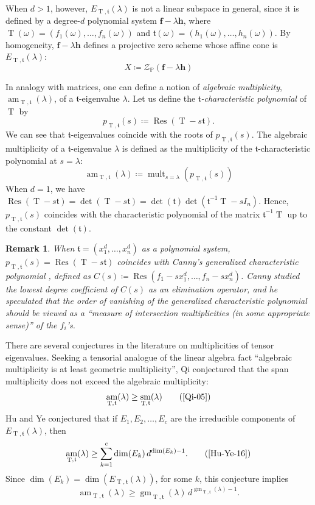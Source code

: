 \documentclass[11pt,letterpaper]{article}
\newtheorem{remark}[theorem]{Remark}\AddToHook{env/remark/begin}{\crefalias{theorem}{remark}}
\numberwithin{equation}{section}
\newcommand{\PP}{\mathbb{P}}
\newcommand{\cZ}{\mathcal{Z}}
\newcommand{\ff}{\ensuremath{\boldsymbol{f}}}
\newcommand{\hh}{\ensuremath{\boldsymbol{h}}}
\newcommand{\ft}{\mathfrak{t}}
\DeclareMathOperator{\gm}{gm}
\DeclareMathOperator{\am}{am}
\DeclareMathOperator{\sm}{sm}
\DeclareMathOperator{\Res}{Res}
\DeclareMathOperator{\T}{T}
\DeclareMathOperator{\mult}{mult}
\begin{document}
When $d>1$, however, $E_{\T,\ft}(\lambda)$ is not a linear subspace in general, since it is defined by a degree-$d$ polynomial system $\ff-\lambda \hh$, where $\T(\omega)=(f_1(\omega),\ldots,f_n(\omega))$ and $\ft(\omega)=(h_1(\omega),\ldots,h_n(\omega))$.
By homogeneity, $\ff-\lambda\hh$ defines a projective zero scheme whose affine cone is $E_{\T,\ft}(\lambda)$:
\[
X\coloneqq \cZ_{\PP}(\ff-\lambda \hh)
\]


In analogy with matrices, one can define a notion of \emph{algebraic multiplicity}, $\am_{\T,\ft}(\lambda)$, of a $\ft$-eigenvalue $\lambda$. 
Let us define the \emph{$\ft$-characteristic polynomial} of $\T$ by
\[ p_{\T,\ft}(s)\coloneqq\Res(\T-s \ft).
\]
We can see that $\ft$-eigenvalues coincide with the roots of $p_{\T,\ft}(s)$.
The algebraic multiplicity of a $\ft$-eigenvalue $\lambda$ is defined as the multiplicity of the $\ft$-characteristic polynomial at $s=\lambda$:\[
\am_{\T,\ft}(\lambda) \coloneqq \mult_{s=\lambda}(p_{\T,\ft}(s))
\]
When $d=1$, we have $\Res(\T- s\ft)=\det(\T-s\ft)=\det(\ft)\det(\ft^{-1}\T-s I_n)$.
Hence, $p_{\T,\ft}(s)$ coincides with the characteristic polynomial of the matrix $\ft^{-1}\T$ up to the constant $\det(\ft)$.

\begin{remark}
When $\ft=(x_1^d,\dots,x_n^d)$ as a polynomial system, $p_{\T,\ft}(s)=\Res(\T-s\ft)$ coincides with Canny's \emph{generalized characteristic polynomial} \cite{Canny-90}, defined as $
C(s) \coloneqq \Res( f_1 - s x_1^d, \dots, f_n - s x_n^d )$. 
Canny studied the lowest degree coefficient of $C(s)$ as an elimination operator, and he speculated that the order of vanishing of the generalized characteristic polynomial should be viewed as a ``measure of intersection multiplicities (in some appropriate sense)'' of the $f_i$'s.
\end{remark}

There are several conjectures in the literature on multiplicities of tensor eigenvalues.
Seeking a tensorial analogue of the linear algebra fact ``algebraic multiplicity is at least geometric multiplicity'',
Qi conjectured that the span multiplicity does not exceed the algebraic multiplicity:\begin{equation}
\label{eq:qi-conj}
\am_{\T,\ft}(\lambda) \geq \sm_{\T,\ft}(\lambda)\tag{\cite[Conjecture~1]{Qi-05}}
\end{equation}
Hu and Ye conjectured that if $E_1,E_2,\dots,E_c$ are the irreducible components of $E_{\T,\ft}(\lambda)$, then \begin{equation}
\label{eq:hu-ye}
\am_{\T,\ft}(\lambda)\geq \sum_{k=1}^c \dim(E_k) \, d^{\dim(E_k)-1}.\tag{\cite[Conjecture~1.1]{Hu-Ye-16}}
\end{equation} 
Since $\dim(E_k)=\dim\left(E_{\T,\ft}(\lambda)\right)$, for some $k$, this conjecture implies \begin{equation}
\label{eq:hu-ye-weak}
\am_{\T,\ft}(\lambda)\geq \gm_{\T,\ft}(\lambda)\, d^{\gm_{\T,\ft}(\lambda)-1}.
\end{equation}
\end{document}

